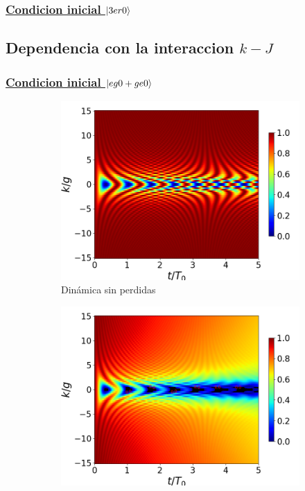 \subsubsection{\underline{Condicion inicial $\ket{3er0}$}}


\subsection{Dependencia con la interaccion $k-J$}
\subsubsection{\underline{Condicion inicial $\ket{eg0+ge0}$}}
\begin{figure}[h]
    \centering
    \begin{subfigure}{0.49\textwidth}
        \includegraphics[width=\textwidth]{figuras/ch4/concu/k/eg0+ge0 d=0.0g x=0.0g J=15.0g gamma=0.25g concu k uni.png}
        \caption{Dinámica sin perdidas}
        \label{fig4:concu k 0 uni}
    \end{subfigure}
    \hfill
    \begin{subfigure}{0.49\textwidth}
        \includegraphics[width=\textwidth]{figuras/ch4/concu/k/eg0+ge0 d=0.0g x=0.0g J=15.0g gamma=0.25g concu k dis.png}

\end{subfigure}
\end{figure}
